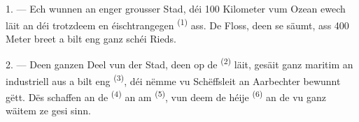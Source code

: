 %
%
%
%

\VUsaut{2.0mm}
\VUsaut{3.0mm}
\VUfilet{16mm}
\VUsaut{5.6mm}
\VUsaut{1.4mm}
\VUsaut{2.2mm}

\VUsaut{3.0mm}

1. --- Ech wunnen an enger grousser Stad, déi 100 Kilometer vum Ozean ewech läit an
déi trotzdeem en éischtrangegen  \textsuperscript{(1)} ass. De Floss,
deen se säumt, ass 400 Meter breet a bilt eng ganz schéi Rieds.

2. --- Deen ganzen Deel vun der Stad, deen op de  \textsuperscript{(2)}
läit, gesäit ganz maritim an industriell aus a bilt eng 
\textsuperscript{(3)}, déi nëmme vu Schëffsleit an Aarbechter bewunnt gëtt. Dës
schaffen an de  \textsuperscript{(4)} an am 
\textsuperscript{(5)}, vun deem de héije  \textsuperscript{(6)} an de
 vu ganz wäitem ze gesi sinn.

